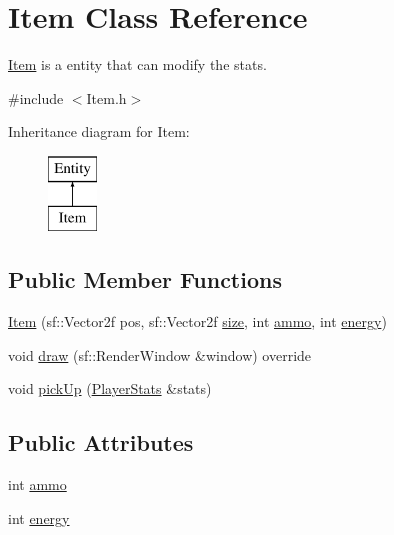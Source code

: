 \hypertarget{class_item}{}\section{Item Class Reference}
\label{class_item}


\hyperlink{class_item}{Item} is a entity that can modify the stats.  




{\ttfamily \#include $<$Item.\+h$>$}

Inheritance diagram for Item\+:\begin{figure}[H]
\begin{center}
\leavevmode
\includegraphics[height=2.000000cm]{class_item}
\end{center}
\end{figure}
\subsection*{Public Member Functions}
\begin{DoxyCompactItemize}
\item 
\hyperlink{class_item_a951b1f5cf04cf8d9ecfdae8553508f0a}{Item} (sf\+::\+Vector2f pos, sf\+::\+Vector2f \hyperlink{class_entity_ae9a0a364c85f91ade5088b3610131417}{size}, int \hyperlink{class_item_a621a125c6d736a8d44a27129fba48068}{ammo}, int \hyperlink{class_item_a5ee3cebbf90b766991c74d09bd5d12bd}{energy})
\item 
void \hyperlink{class_item_a2ec323b2001bee948fa560ee8ee48067}{draw} (sf\+::\+Render\+Window \&window) override
\item 
void \hyperlink{class_item_a149c95695cc750a3f2de14eb4ed6ef21}{pick\+Up} (\hyperlink{struct_player_stats}{Player\+Stats} \&stats)
\end{DoxyCompactItemize}
\subsection*{Public Attributes}
\begin{DoxyCompactItemize}
\item 
int \hyperlink{class_item_a621a125c6d736a8d44a27129fba48068}{ammo}
\item 
int \hyperlink{class_item_a5ee3cebbf90b766991c74d09bd5d12bd}{energy}
\end{DoxyCompactItemize}
